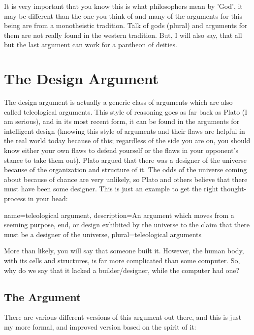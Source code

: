 It is very important that you know this is what philosophers mean by 'God', it may be different than the one you think of and many of the arguments for this being are from a monotheistic tradition. Talk of gods (plural) and arguments for them are not really found in the western tradition. But, I will also say, that all but the last argument can work for a pantheon of deities. 

\section{The Design Argument}

The design argument is actually a generic class of arguments which are also called \glspl{teleological argument}. This style of reasoning goes as far back as Plato (I am serious), and in its most recent form, it can be found in the arguments for intelligent design (knowing this style of arguments and their flaws are helpful in the real world today because of this; regardless of the side you are on, you should know either your own flaws to defend yourself or the flaws in your opponent's stance to take them out). Plato argued that there was a designer of the universe because of the organization and structure of it. The odds of the universe coming about because of chance are very unlikely, so Plato and others believe that there must have been some designer. This is just an example to get the right thought-process in your head:

{
name=teleological argument,
description={An argument which moves from a seeming purpose, end, or design exhibited by the universe to the claim that there must be a designer of the universe},
plural=teleological arguments
}



More than likely, you will say that someone built it. However, the human body, with its cells and structures, is far more complicated than some computer. So, why do we say that it lacked a builder/designer, while the computer had one? 
\subsection{The Argument}
There are various different versions of this argument out there, and this is just my more formal, and improved version based on the spirit of it:

